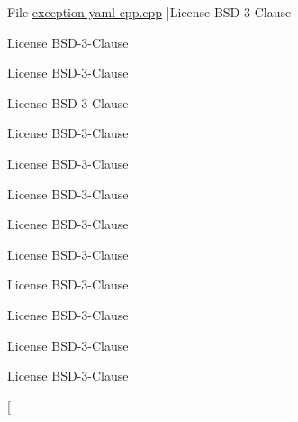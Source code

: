 \begin{DoxyRefList}
\hypertarget{license__license000053}{}%
File \hyperlink{exception-yaml-cpp_8cpp}{exception-\/yaml-\/cpp.cpp} ]License B\+S\+D-\/3-\/\+Clause  
\item[\label{license__license000013}%
\hypertarget{license__license000013}{}%
File \hyperlink{exception-yaml-cpp_8hpp}{exception-\/yaml-\/cpp.hpp} ]License B\+S\+D-\/3-\/\+Clause  
\item[\label{license__license000001}%
\hypertarget{license__license000001}{}%
File \hyperlink{main_8cpp}{main.cpp} ]License B\+S\+D-\/3-\/\+Clause  
\item[\label{license__license000020}%
\hypertarget{license__license000020}{}%
File \hyperlink{matrix__geometry_8hh}{matrix\+\_\+geometry.hh} ]License B\+S\+D-\/3-\/\+Clause  
\item[\label{license__license000054}%
\hypertarget{license__license000054}{}%
File \hyperlink{periodic-call_8cpp}{periodic-\/call.cpp} ]License B\+S\+D-\/3-\/\+Clause  
\item[\label{license__license000014}%
\hypertarget{license__license000014}{}%
File \hyperlink{periodic-call_8hh}{periodic-\/call.hh} ]License B\+S\+D-\/3-\/\+Clause  
\item[\label{license__license000031}%
\hypertarget{license__license000031}{}%
File \hyperlink{prologue_8py}{prologue.py} ]License B\+S\+D-\/3-\/\+Clause  
\item[\label{license__license000032}%
\hypertarget{license__license000032}{}%
File \hyperlink{robot_8py}{robot.py} ]License B\+S\+D-\/3-\/\+Clause  
\item[\label{license__license000038}%
\hypertarget{license__license000038}{}%
File \hyperlink{robot__pose__publisher_8py}{robot\+\_\+pose\+\_\+publisher.py} ]License B\+S\+D-\/3-\/\+Clause  
\item[\label{license__license000034}%
\hypertarget{license__license000034}{}%
File \hyperlink{ros_8py}{ros.py} ]License B\+S\+D-\/3-\/\+Clause  
\item[\label{license__license000035}%
\hypertarget{license__license000035}{}%
File \hyperlink{ros__client_8py}{ros\+\_\+client.py} ]License B\+S\+D-\/3-\/\+Clause  
\item[\label{license__license000064}%
\hypertarget{license__license000064}{}%
File \hyperlink{ros__init_8cpp}{ros\+\_\+init.cpp} ]License B\+S\+D-\/3-\/\+Clause  
\item[\label{license__license000015}%
\hypertarget{license__license000015}{}%
File \hyperlink{ros__init_8hh}{ros\+\_\+init.hh} ]License B\+S\+D-\/3-\/\+Clause  
\item[\label{license__license000065}%

\end{DoxyRefList}
